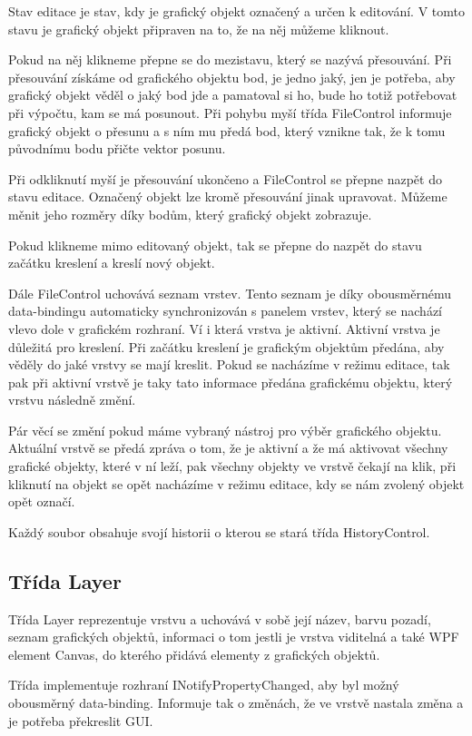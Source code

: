 \documentclass[
  field=inf,
  biblatex,
  glossaries,
  index
]{kidiplom}
\begin{document}
Stav editace je stav, kdy je grafický objekt označený a určen k editování. V tomto stavu je grafický objekt připraven na to, že na něj můžeme kliknout. 

Pokud na něj klikneme přepne se do mezistavu, který se nazývá přesouvání. Při přesouvání získáme od grafického objektu bod, je jedno jaký, jen je potřeba, aby grafický objekt věděl o jaký bod jde a pamatoval si ho, bude ho totiž potřebovat při výpočtu, kam se má posunout. Při pohybu myší třída FileControl informuje grafický objekt o přesunu a s ním mu předá bod, který vznikne tak, že k tomu původnímu bodu přičte vektor posunu.

Při odkliknutí myší je přesouvání ukončeno a FileControl se přepne nazpět do stavu editace. Označený objekt lze kromě přesouvání jinak upravovat. Můžeme měnit jeho rozměry díky bodům, který grafický objekt zobrazuje.

Pokud klikneme mimo editovaný objekt, tak se přepne do nazpět do stavu začátku kreslení a kreslí nový objekt.

Dále FileControl uchovává seznam vrstev. Tento seznam je díky obousměrnému data-bindingu automaticky synchronizován s panelem vrstev, který se nachází vlevo dole v grafickém rozhraní. Ví i která vrstva je aktivní. Aktivní vrstva je důležitá pro kreslení. Při začátku kreslení je grafickým objektům předána, aby věděly do jaké vrstvy se mají kreslit. Pokud se nacházíme v režimu editace, tak pak při aktivní vrstvě je taky tato informace předána grafickému objektu, který vrstvu následně změní.

Pár věcí se změní pokud máme vybraný nástroj pro výběr grafického objektu. Aktuální vrstvě se předá zpráva o tom, že je aktivní a že má aktivovat všechny grafické objekty, které v ní leží, pak všechny objekty ve vrstvě čekají na klik, při kliknutí na objekt se opět nacházíme v režimu editace, kdy se nám zvolený objekt opět označí.

Každý soubor obsahuje svojí historii o kterou se stará třída HistoryControl.

\subsection{Třída Layer}

Třída Layer reprezentuje vrstvu a uchovává v sobě její název, barvu pozadí, seznam grafických objektů, informaci o tom jestli je vrstva viditelná a také WPF element Canvas, do kterého přidává elementy z grafických objektů. 

Třída implementuje rozhraní INotifyPropertyChanged, aby byl možný obousměrný data-binding. Informuje tak o změnách, že ve vrstvě nastala změna a je potřeba překreslit GUI.
\end{document}
